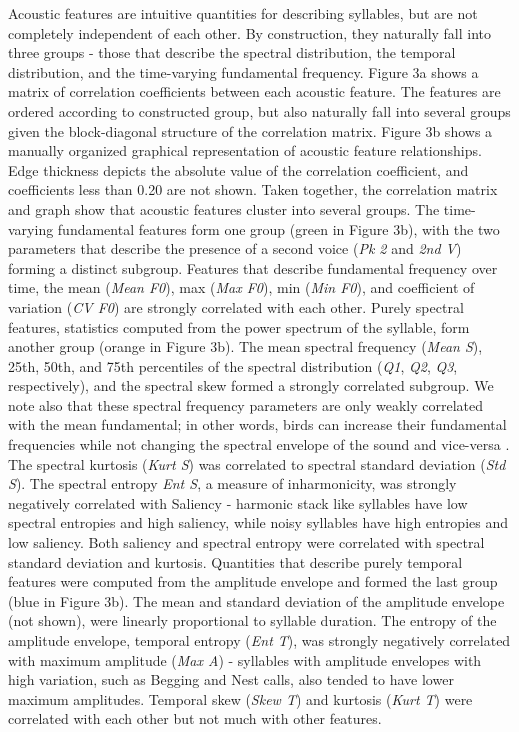     Acoustic features are intuitive quantities for describing syllables, but are not completely independent of each other. By construction, they naturally fall into three groups - those that describe the spectral distribution, the temporal distribution, and the time-varying fundamental frequency. Figure 3a shows a matrix of correlation coefficients between each acoustic feature. The features are ordered according to constructed group, but also naturally fall into several groups given the block-diagonal structure of the correlation matrix. Figure 3b shows a manually organized graphical representation of acoustic feature relationships. Edge thickness depicts the absolute value of the correlation coefficient, and coefficients less than 0.20 are not shown.
Taken together, the correlation matrix and graph show that acoustic features cluster into several groups. The time-varying fundamental features form one group (green in Figure 3b), with the two parameters that describe the presence of a second voice ({\em Pk 2} and {\em 2nd V}) forming a distinct subgroup. Features that describe fundamental frequency over time, the mean ({\em Mean F0}), max ({\em Max F0}), min ({\em Min F0}), and coefficient of variation ({\em CV F0}) are strongly correlated with each other. Purely spectral features, statistics computed from the power spectrum of the syllable, form another group (orange in Figure 3b). The mean spectral frequency ({\em Mean S}), 25th, 50th, and 75th percentiles of the spectral distribution ({\em Q1}, {\em Q2}, {\em Q3}, respectively), and the spectral skew formed a strongly correlated subgroup. We note also that these spectral frequency parameters are only weakly correlated with the mean fundamental; in other words, birds can increase their fundamental frequencies while not changing the spectral envelope of the sound and vice-versa \cite{Elie2015b}. The spectral kurtosis ({\em Kurt S}) was correlated to spectral standard deviation ({\em Std S}). The spectral entropy {\em Ent S}, a measure of inharmonicity, was strongly negatively correlated with Saliency - harmonic stack like syllables have low spectral entropies and high saliency, while noisy syllables have high entropies and low saliency. Both saliency and spectral entropy were correlated with spectral standard deviation and kurtosis. Quantities that describe purely temporal features were computed from the amplitude envelope and formed the last group (blue in Figure 3b). The mean and standard deviation of the amplitude envelope (not shown), were linearly proportional to syllable duration. The entropy of the amplitude envelope, temporal entropy ({\em Ent T}), was strongly negatively correlated with maximum amplitude ({\em Max A}) - syllables with amplitude envelopes with high variation, such as Begging and Nest calls, also tended to have lower maximum amplitudes. Temporal skew ({\em Skew T}) and kurtosis ({\em Kurt T}) were correlated with each other but not much with other features.

